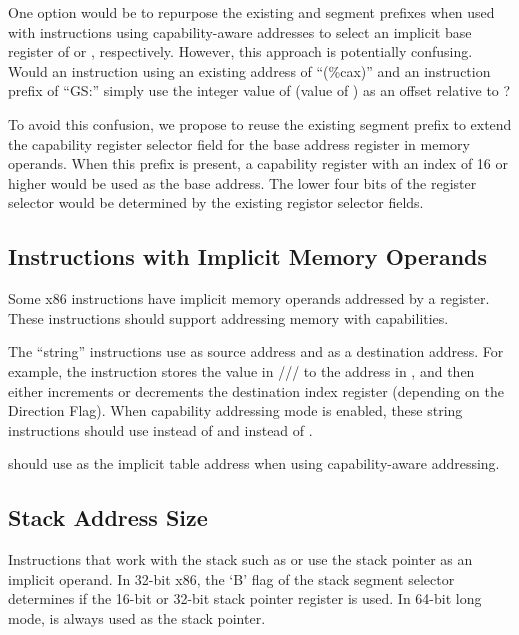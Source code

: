 One option would be to repurpose the existing \FS{} and \GS{} segment
prefixes when used with instructions using capability-aware addresses
to select an implicit base register of \CFS{} or \CGS{}, respectively.
However, this approach is potentially confusing.  Would an instruction
using an existing address of ``(\%cax)'' and an instruction prefix of
``GS:'' simply use the integer value of \CAX{} (value of \RAX{}) as an offset
relative to \CGS{}?

To avoid this confusion, we propose to reuse the existing \GS{}
segment prefix to extend the capability register selector field for
the base address register in memory operands.  When this prefix is
present, a capability register with an index of 16 or higher would be
used as the base address.  The lower four bits of the register
selector would be determined by the existing registor selector fields.

\subsection{Instructions with Implicit Memory Operands}

Some x86 instructions have implicit memory operands addressed by a
register.  These instructions should support addressing memory with
capabilities.

The ``string''
instructions use \RSI{} as source address and \RDI{} as a destination address.
For example, the
 instruction stores the value in \AL{}/\AX{}/\EAX{}/\RAX{} to the address in
\RDI{}, and then either increments or decrements the destination
index register (depending on the Direction Flag).  When capability
addressing mode is enabled,
these string instructions should use \CSI{} instead of \RSI{} and \CDI{} instead of
\RDI{}.

 should use \CBX{} as the implicit table address when
using capability-aware addressing.

\subsection{Stack Address Size}

Instructions that work with the stack such as  or
 use the stack pointer as an implicit operand.  In
32-bit x86, the `B' flag of the stack segment selector determines if
the 16-bit or 32-bit stack pointer register is used.  In 64-bit long
mode, \RSP{} is always used as the stack pointer.


